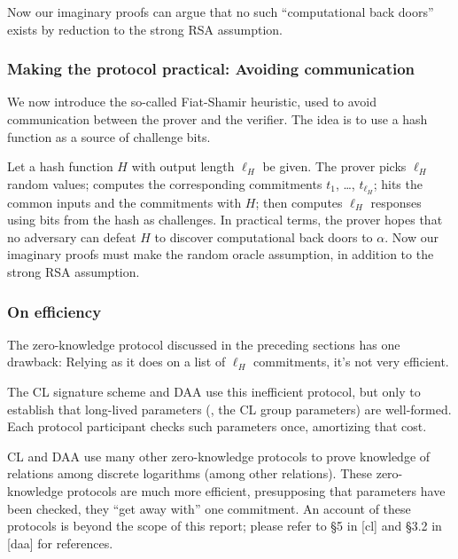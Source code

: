 Now our imaginary proofs can argue that no such ``computational
back doors'' exists by reduction to the strong RSA assumption.

\subsubsection{Making the protocol practical: Avoiding communication}

We now introduce the so-called Fiat-Shamir heuristic, used to avoid
communication between the prover and the verifier.
The idea is to use a hash function as a source of challenge bits.

Let a hash function $H$ with output length $\ell_H$ be given.
The prover picks $\ell_H$ random values; computes the corresponding
commitments $t_1$, \ldots, $t_{\ell_H}$;
hits the common inputs and the commitments with $H$;
then computes $\ell_H$ responses using bits from
the hash as challenges. In practical terms, the prover hopes
that no adversary can defeat $H$ to discover
computational back doors to $\alpha$. Now our imaginary proofs must
make the random oracle assumption, in addition to the strong
RSA assumption.

\subsubsection{On efficiency}

The zero-knowledge protocol discussed in the preceding sections has one
drawback: Relying as it does on a list of $\ell_H$ commitments, it's not
very efficient.

The CL signature scheme and DAA use this inefficient protocol,
but only to establish that long-lived parameters (\eg, the CL group
parameters) are well-formed.
Each protocol participant checks such parameters once, amortizing that cost.

CL and DAA use many other zero-knowledge protocols to prove knowledge
of relations among discrete logarithms (among other relations).
These zero-knowledge protocols
are much more efficient, presupposing that parameters have been
checked, they ``get away with'' one commitment.
An account of these protocols is beyond the scope of this report;
please refer to \S\/5 in [cl] and \S\/3.2 in [daa] for references.
